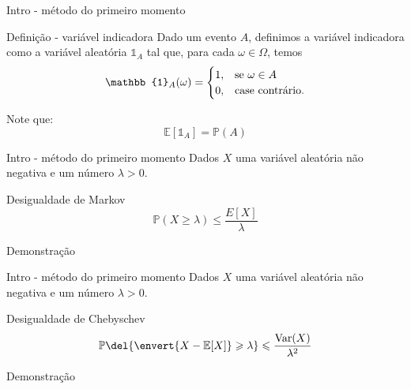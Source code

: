 \documentclass{beamer}
\DeclareMathOperator{\var}{Var}
\begin{document}
    \begin{frame}{Intro - método do primeiro momento}
        \begin{block}{Definição - variável indicadora}
            Dado um evento $A$, definimos a variável indicadora como a variável
            aleatória $\mathbb{1}_A$ tal que, para cada $\omega \in \Omega$,
            temos
            \[\mathbb{1}_A(\omega)=\begin{cases}
                1,&\textup{se }\omega\in A\\
                0,&\textup{case contrário}.
            \end{cases}\]

            \alert{Note que:}
            \[\mathbb{E}[\mathbb{1}_A]=\mathbb{P}(A)\]
        \end{block}
    \end{frame}

    \begin{frame}{Intro - método do primeiro momento}
        \vspace{-1cm}
        Dados $X$ uma variável aleatória não negativa e um número $\lambda > 0$.

        \begin{block}{Desigualdade de Markov}
            \[ \mathbb{P}(X\geqslant \lambda)\leqslant \dfrac{E[X]}{\lambda} \]
        \end{block}

        \begin{exampleblock}{Demonstração}
        \end{exampleblock} \vspace{\stretch2}
    \end{frame}

    \begin{frame}{Intro - método do primeiro momento}
        \vspace{-1cm}
        Dados $X$ uma variável aleatória não negativa e um número $\lambda > 0$.

        \begin{block}{Desigualdade de Chebyschev}
            \[ \mathbb{P}\del{\envert{X-\mathbb{E}[X]}\geqslant\lambda}\leqslant
            \dfrac{\var(X)}{\lambda^2} \]
        \end{block}

        \begin{exampleblock}{Demonstração}
        \end{exampleblock} \vspace{\stretch2}
    \end{frame}
\end{document}
